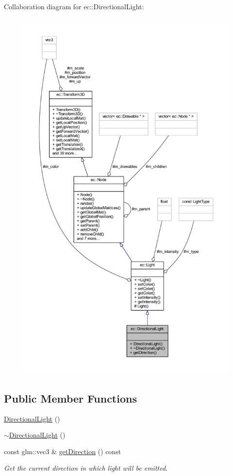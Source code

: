 Collaboration diagram for ec\+:\+:Directional\+Light\+:\nopagebreak
\begin{figure}[H]
\begin{center}
\leavevmode
\includegraphics[height=550pt]{classec_1_1_directional_light__coll__graph}
\end{center}
\end{figure}
\subsection*{Public Member Functions}
\begin{DoxyCompactItemize}
\item 
\mbox{\hyperlink{classec_1_1_directional_light_a21208a110e98ec0db1b7d9edef25e502}{Directional\+Light}} ()
\item 
\mbox{\hyperlink{classec_1_1_directional_light_a73b5c62493aa93c576517509207a2168}{$\sim$\+Directional\+Light}} ()
\item 
const glm\+::vec3 \& \mbox{\hyperlink{classec_1_1_directional_light_af7bdf6f7576f38b48a8b6aa7301ef04e}{get\+Direction}} () const
\begin{DoxyCompactList}\small\item\em Get the current direction in which light will be emitted. \end{DoxyCompactList}\end{DoxyCompactItemize}
